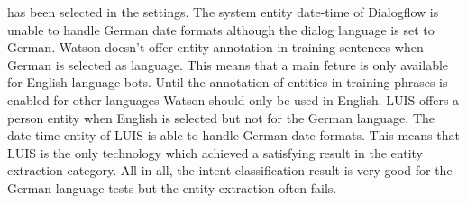 has been selected in the settings. 
The system entity date-time of Dialogflow is unable to handle German date formats although 
the dialog language is set to German.
Watson doesn't offer entity annotation in training sentences when German is selected as language.
This means that a main feture is only available for English language bots.
Until the annotation of entities in training phrases is enabled for other languages Watson should only be 
used in English.
LUIS offers a person entity when English is selected but not for the German language.
The date-time entity of LUIS is able to handle German date formats. 
This means that LUIS is the only technology which achieved a satisfying result in the entity extraction category.
All in all, the intent classification result is very good for the German language tests but the entity extraction 
often fails.






